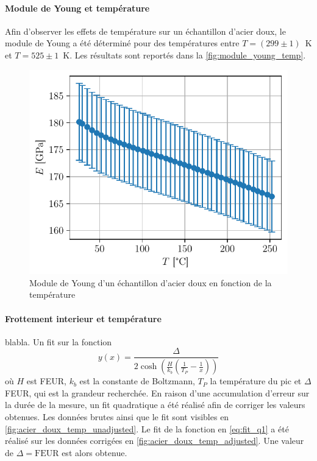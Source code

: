 \paragraph{Module de Young et température} Afin d'observer les effets de température sur un échantillon d'acier doux, le module de Young a été déterminé pour des températures entre \mbox{\(T = (299 \pm 1)\) \si{\kelvin}} et \mbox{\(T = 525 \pm 1\) \si{\kelvin}}. Les résultats sont reportés dans la \autoref{fig:module_young_temp}.

\begin{figure}[h]
    \centering
    \includegraphics[width=0.6\linewidth]{figures/acier_doux_module_young_temp.pdf}
    \caption{Module de Young d'un échantillon d'acier doux en fonction de la température}
    \label{fig:module_young_temp}
\end{figure}

\paragraph{Frottement interieur et température} blabla. Un fit sur la fonction
\begin{equation}
    y(x) = \frac{\Delta}{2 \cosh \left(\frac{H}{k_b}\left(\frac{1}{T_P} - \frac{1}{x}\right)\right)}
    \label{eq:fit_q1}
\end{equation}
où \(H\) est FEUR, \(k_b\) est la constante de Boltzmann, \(T_P\) la température du pic et \(\Delta\) FEUR, qui est la grandeur recherchée. En raison d'une accumulation d'erreur sur la durée de la mesure, un fit quadratique a été réalisé afin de corriger les valeurs obtenues. Les données brutes ainsi que le fit sont visibles en \autoref{fig:acier_doux_temp_unadjusted}. Le fit de la fonction en \autoref{eq:fit_q1} a été réalisé sur les données corrigées en \autoref{fig:acier_doux_temp_adjusted}. Une valeur de \(\Delta = \textrm{FEUR}\) est alors obtenue.

